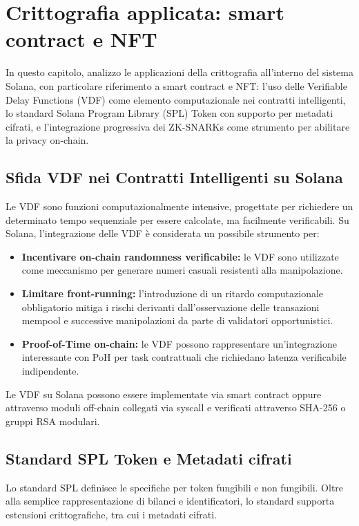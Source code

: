 \documentclass[a4paper,12pt]{report}
\begin{document}
	\chapter{Crittografia applicata: smart contract e NFT}
	In questo capitolo, analizzo le applicazioni della crittografia all'interno del sistema Solana, con particolare riferimento a smart contract e NFT: l'uso delle Verifiable Delay Functions (VDF) come elemento computazionale nei contratti intelligenti, lo standard Solana Program Library (SPL) Token con supporto per metadati cifrati, e l’integrazione progressiva dei ZK-SNARKs come strumento per abilitare la privacy on-chain.
	
	\section{Sfida VDF nei Contratti Intelligenti su Solana}
	Le VDF sono funzioni computazionalmente intensive, progettate per richiedere un determinato tempo sequenziale per essere calcolate, ma facilmente verificabili. Su Solana, l’integrazione delle VDF è considerata un possibile strumento per:
	\begin{itemize}
		\item \textbf{Incentivare on-chain randomness verificabile:} le VDF sono utilizzate come meccanismo per generare numeri casuali resistenti alla manipolazione.
		\item \textbf{Limitare front-running:} l’introduzione di un ritardo computazionale obbligatorio mitiga i rischi derivanti dall’osservazione delle transazioni mempool e successive manipolazioni da parte di validatori opportunistici.
		\item \textbf{Proof-of-Time on-chain:} le VDF possono rappresentare un’integrazione interessante con PoH per task contrattuali che richiedano latenza verificabile indipendente.
	\end{itemize}
	Le VDF su Solana possono essere implementate via smart contract oppure attraverso moduli off-chain collegati via syscall e verificati attraverso SHA-256 o gruppi RSA modulari.
	
	\section{Standard SPL Token e Metadati cifrati}
	Lo standard SPL definisce le specifiche per token fungibili e non fungibili. Oltre alla semplice rappresentazione di bilanci e identificatori, lo standard supporta estensioni crittografiche, tra cui i metadati cifrati.
	
\end{document}
